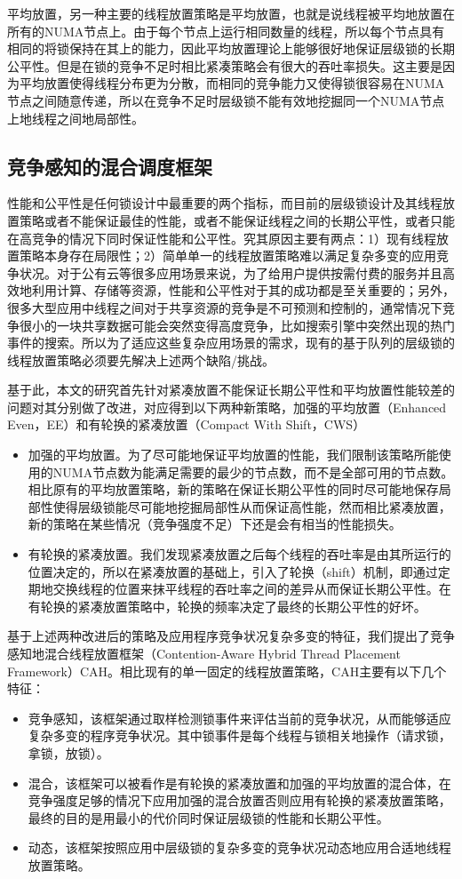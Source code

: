平均放置，另一种主要的线程放置策略是平均放置，也就是说线程被平均地放置在所有的NUMA节点上。由于每个节点上运行相同数量的线程，所以每个节点具有相同的将锁保持在其上的能力，因此平均放置理论上能够很好地保证层级锁的长期公平性。但是在锁的竞争不足时相比紧凑策略会有很大的吞吐率损失。这主要是因为平均放置使得线程分布更为分散，而相同的竞争能力又使得锁很容易在NUMA节点之间随意传递，所以在竞争不足时层级锁不能有效地挖掘同一个NUMA节点上地线程之间地局部性。

\subsection{竞争感知的混合调度框架}
性能和公平性是任何锁设计中最重要的两个指标，而目前的层级锁设计及其线程放置策略或者不能保证最佳的性能，或者不能保证线程之间的长期公平性，或者只能在高竞争的情况下同时保证性能和公平性。究其原因主要有两点：1）现有线程放置策略本身存在局限性；2）简单单一的线程放置策略难以满足复杂多变的应用竞争状况。对于公有云等很多应用场景来说，为了给用户提供按需付费的服务并且高效地利用计算、存储等资源，性能和公平性对于其的成功都是至关重要的\cite{rao2014towards}；另外，很多大型应用中线程之间对于共享资源的竞争是不可预测和控制的，通常情况下竞争很小的一块共享数据可能会突然变得高度竞争，比如搜索引擎中突然出现的热门事件的搜索\cite{chabbi2016contention}。所以为了适应这些复杂应用场景的需求，现有的基于队列的层级锁的线程放置策略必须要先解决上述两个缺陷/挑战。

基于此，本文的研究首先针对紧凑放置不能保证长期公平性和平均放置性能较差的问题对其分别做了改进，对应得到以下两种新策略，加强的平均放置（Enhanced Even，EE）和有轮换的紧凑放置（Compact With Shift，CWS）
\begin{itemize}
\item 加强的平均放置。为了尽可能地保证平均放置的性能，我们限制该策略所能使用的NUMA节点数为能满足需要的最少的节点数，而不是全部可用的节点数。相比原有的平均放置策略，新的策略在保证长期公平性的同时尽可能地保存局部性使得层级锁能尽可能地挖掘局部性从而保证高性能，然而相比紧凑放置，新的策略在某些情况（竞争强度不足）下还是会有相当的性能损失。
\item 有轮换的紧凑放置。我们发现紧凑放置之后每个线程的吞吐率是由其所运行的位置决定的，所以在紧凑放置的基础上，引入了轮换（shift）机制，即通过定期地交换线程的位置来抹平线程的吞吐率之间的差异从而保证长期公平性。在有轮换的紧凑放置策略中，轮换的频率决定了最终的长期公平性的好坏。
\end{itemize}
基于上述两种改进后的策略及应用程序竞争状况复杂多变的特征，我们提出了竞争感知地混合线程放置框架（Contention-Aware Hybrid Thread Placement Framework）CAH。相比现有的单一固定的线程放置策略，CAH主要有以下几个特征：
\begin{itemize}
\item 竞争感知，该框架通过取样检测锁事件来评估当前的竞争状况，从而能够适应复杂多变的程序竞争状况。其中锁事件是每个线程与锁相关地操作（请求锁，拿锁，放锁）。
\item 混合，该框架可以被看作是有轮换的紧凑放置和加强的平均放置的混合体，在竞争强度足够的情况下应用加强的混合放置否则应用有轮换的紧凑放置策略，最终的目的是用最小的代价同时保证层级锁的性能和长期公平性。
\item 动态，该框架按照应用中层级锁的复杂多变的竞争状况动态地应用合适地线程放置策略。
\end{itemize}

